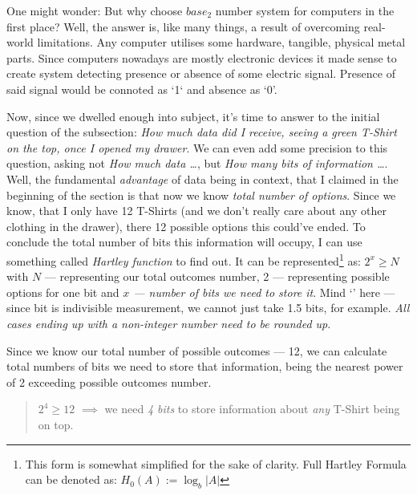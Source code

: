 \documentclass{article}
\begin{document}
            One might wonder: But why choose $base_2$ number system for computers in the first place? Well, the answer is, like many things, a result of overcoming
            real-world limitations. Any computer utilises some hardware, tangible, physical metal parts. Since computers nowadays are mostly electronic devices 
            it made sense to create system detecting presence or absence of some electric signal. Presence of said signal would be connoted as `1` and absence as `0'. \par

            Now, since we dwelled enough into subject, it's time to answer to the initial question of the subsection: \emph{How much data did I receive, seeing a green 
            T-Shirt on the top, once I opened my drawer}. We can even add some precision to this question, asking not \emph{How much data \ldots}, but \emph{How many bits of information \ldots}.
            Well, the fundamental \emph{advantage} of data being in context, that I claimed in the beginning of the section is that now we know \emph{total number of options}.
            Since we know, that I only have 12 T-Shirts (and we don't really care about any other clothing in the drawer), there 12 possible options this could've ended. To 
            conclude the total number of bits this information will occupy, I can use something called \emph{Hartley function} to find out. It can be 
            represented\footnote{This form is somewhat simplified for the sake of clarity. Full Hartley Formula can be denoted as: $H_0(A) := \log_b|A|$}
            as: $2^x \geq N$ with $N$ --- representing our total outcomes number, 2 --- representing possible options for one bit and 
            \emph{$x$ --- number of bits we need to store it}.
            Mind `\geq' here --- since bit is indivisible measurement, we cannot just take 1.5 bits, for example.
            \emph{All cases ending up with a non-integer number need to be rounded up}. \par

            Since we know our total number of possible outcomes --- 12, we can calculate total numbers of bits we need to store that information, being the nearest power of 2
            exceeding possible outcomes number.
            
            \begin{quote}
                $2^4 \geq 12$ $\implies$ we need \emph{4 bits} to store information about \emph{any} T-Shirt being on top.
            \end{quote}
\end{document}
